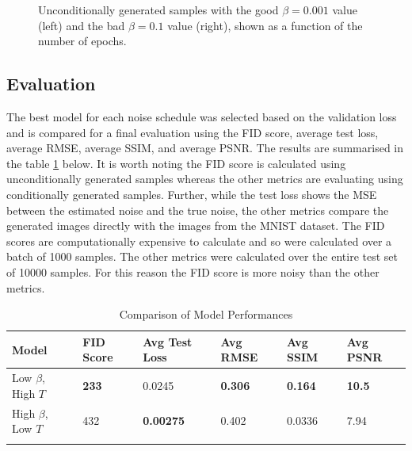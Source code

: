 \documentclass[11pt]{article}
\begin{document}
\begin{figure}[H]
\begin{minipage}{0.48\textwidth}
        \label{fig:train_uncond_right_img}
    \end{minipage}
    \caption{Unconditionally generated samples with the good $\beta=0.001$ value (left) and the bad $\beta=0.1$ value (right), shown as a function of the number of epochs.}
    \label{fig:train_unconditional_samples}
\end{figure}
\subsection{Evaluation}
The best model for each noise schedule was selected based on the validation loss and is compared for a final evaluation using the FID score, average test loss, average RMSE, average SSIM, and average PSNR. The results are summarised in the table \ref{tab:q1b_model_comparison} below. It is worth noting the FID score is calculated using unconditionally generated samples whereas the other metrics are evaluating using conditionally generated samples. Further, while the test loss shows the MSE between the estimated noise and the true noise, the other metrics compare the generated images directly with the images from the MNIST dataset. The FID scores are computationally expensive to calculate and so were calculated over a batch of 1000 samples. The other metrics were calculated over the entire test set of 10000 samples. For this reason the FID score is more noisy than the other metrics.
\begin{table}[H]
    \centering
    \caption{Comparison of Model Performances}
    \begin{tabular}{l|lllll}
    \hline
    Model          & FID Score           & Avg Test Loss        & Avg RMSE           & Avg SSIM         & Avg PSNR           \\ \hline
    Low $\beta$, High $T$ & \textbf{233}    & 0.0245              & \textbf{0.306}            & \textbf{0.164} & \textbf{10.5}    \\
    High $\beta$, Low $T$  & 432             & \textbf{0.00275}     & 0.402  & 0.0336          & 7.94              \\ \hline
    \label{tab:q1b_model_comparison}
    \end{tabular}
    \end{table}
\end{document}
